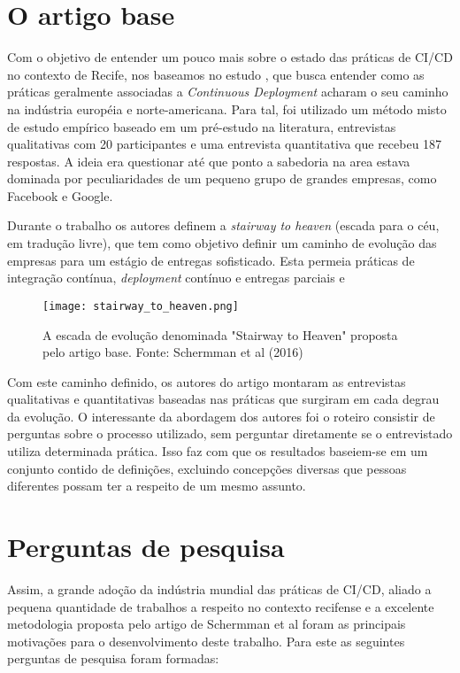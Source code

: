 
\section{O artigo base}
Com o objetivo de entender um pouco mais sobre o estado das práticas de CI/CD no contexto de Recife, nos baseamos no estudo \cite{empiricalStudy2016}, que busca entender como as práticas geralmente associadas a \emph{Continuous Deployment} acharam o seu caminho na indústria européia e norte-americana. Para tal, foi utilizado um método misto de estudo empírico baseado em um pré-estudo na literatura, entrevistas qualitativas com 20 participantes e uma entrevista quantitativa que recebeu 187 respostas. A ideia era questionar até que ponto a sabedoria na area estava dominada por peculiaridades de um pequeno grupo de grandes empresas, como Facebook e Google.

Durante o trabalho os autores definem a \emph{stairway to heaven} (escada para o céu, em tradução livre), que tem como objetivo definir um caminho de evolução das empresas para um estágio de entregas sofisticado. Esta permeia práticas de integração contínua, \emph{deployment} contínuo e entregas parciais e 

\begin{figure}[ht]
\begin{center}
\texttt{[image: stairway\_to\_heaven.png]}
\end{center}
\caption[Stairway to Heaven]{
    A escada de evolução denominada "Stairway to Heaven" proposta pelo artigo base.
    Fonte: Schermman et al (2016)
}\label{fig_exe}

\end{figure}

Com este caminho definido, os autores do artigo montaram as entrevistas qualitativas e quantitativas baseadas nas práticas que surgiram em cada degrau da evolução. O interessante da abordagem dos autores foi o roteiro consistir de perguntas sobre o processo utilizado, sem perguntar diretamente se o entrevistado utiliza determinada prática. Isso faz com que os resultados baseiem-se em um conjunto contido de definições, excluindo concepções diversas que pessoas diferentes possam ter a respeito de um mesmo assunto.

\section{Perguntas de pesquisa} 
Assim, a grande adoção da indústria mundial das práticas de CI/CD, aliado a pequena quantidade de trabalhos a respeito no contexto recifense e a excelente metodologia proposta pelo artigo de Schermman et al \cite{empiricalStudy2016} foram as principais motivações para o desenvolvimento deste trabalho. Para este as seguintes perguntas de pesquisa foram formadas:

